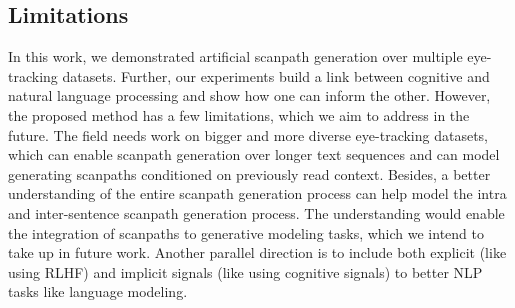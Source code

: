 \subsection{Limitations}
\label{Limitations}
In this work, we demonstrated artificial scanpath generation over multiple eye-tracking datasets. Further, our experiments build a link between cognitive and natural language processing and show how one can inform the other. However, the proposed method has a few limitations, which we aim to address in the future. The field needs work on bigger and more diverse eye-tracking datasets, which can enable scanpath generation over longer text sequences and can model generating scanpaths conditioned on previously read context. Besides, a better understanding of the entire scanpath generation process can help model the intra and inter-sentence scanpath generation process. The understanding would enable the integration of scanpaths to generative modeling tasks, which we intend to take up in future work. Another parallel direction is to include both explicit (like using RLHF) and implicit signals (like using cognitive signals) to better NLP tasks like language modeling.




